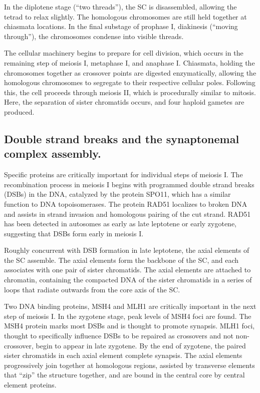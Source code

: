 In the diplotene stage (``two threads''), the SC is disassembled, allowing the tetrad to relax slightly.
The homologous chromosomes are still held together at chiasmata locations.
In the final substage of prophase I, diakinesis (``moving through''), the chromosomes condense into visible threads.

The cellular machinery begins to prepare for cell division, which occurs in the remaining step of meiosis I, metaphase I, and anaphase I.
Chiasmata, holding the chromosomes together as crossover points are digested enzymatically, allowing the homologous chromosomes to segregate to their respective cellular poles.  
Following this, the cell proceeds through meiosis II, which is procedurally similar to mitosis.
Here, the separation of sister chromatids occurs, and four haploid gametes are produced.



\subsection{Double strand breaks and the synaptonemal complex assembly.}

Specific proteins are critically important for individual steps of meiosis I.
The recombination process in meiosis I begins with programmed double strand breaks (DSBs) in the DNA, catalyzed by the protein SPO11, which has a similar function to DNA topoisomerases\cite{DeMassy2013}.
The protein RAD51 localizes to broken DNA and assists in strand invasion and homologous pairing of the cut strand.
RAD51 has been detected in autosomes as early as late leptotene or early zygotene\cite{Oliver-Bonet2005}, suggesting that DSBs form early in meiosis I.

Roughly concurrent with DSB formation in late leptotene, the axial elements of the SC assemble\cite{Yang2009}.
The axial elements form the backbone of the SC, and each associates with one pair of sister chromatids.
The axial elements are attached to chromatin, containing the compacted DNA of the sister chromatids in a series of loops that radiate outwards from the core axis of the SC.

Two DNA binding proteins, MSH4 and MLH1 are critically important in the next step of meiosis I.
In the zygotene stage, peak levels of MSH4 foci are found.
The MSH4 protein marks most DSBs and is thought to promote synapsis\cite{Oliver-Bonet2005}.
MLH1 foci, thought to specifically influence DSBs to be repaired as crossovers and not non-crossover\cite{Baker1996}, begin to appear in late zygotene\cite{Oliver-Bonet2005}.
By the end of zygotene, the paired sister chromatids in each axial element complete synapsis.
The axial elements progressively join together at homologous regions, assisted by transverse elements that ``zip'' the structure together, and are bound in the central core by central element proteins\cite{Yang2009}.

